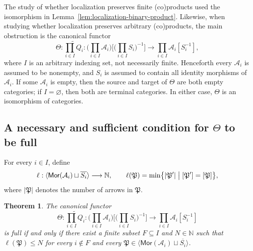 \documentclass[10pt,a4paper]{amsart}
\theoremstyle{plain}
\newtheorem{theorem}{Theorem}[section]
\theoremstyle{definition}
\theoremstyle{remark}
\begin{document}
The study of whether localization preserves finite (co)products used the isomorphism in Lemma~\ref{lem:localization-binary-product}.
Likewise, when studying whether localization preserves arbitrary (co)products, the main obstruction is the canonical functor
\[
  \Theta : \widetilde {\prod_{i \in I} Q_i} :
  \bigg(\prod_{i \in I} \mathcal{A}_i \bigg)\bigg[\big(\prod_{i \in I}S_i\big)^{-1}\bigg]
  \longrightarrow\prod_{i \in I}\mathcal{A}_i[S_i^{-1}],
\]
where $I$ is an arbitrary indexing set, not necessarily finite.
Henceforth every $\mathcal A_i$ is assumed to be nonempty, and $S_i$ is assumed to contain all identity morphisms of $\mathcal A_i$.
If some $\mathcal A_i$ is empty, then the source and target of $\Theta$ are both empty categories; if $I=\varnothing$, then both are terminal categories.
In either case, $\Theta$ is an isomorphism of categories.

\subsection{A necessary and sufficient condition for \texorpdfstring{$\Theta$}{Theta} to be full}
For every $i\in I$, define
\[
  \ell:
  \langle\mathsf{Mor}(\mathcal A_i)\sqcup\overline{S_i}\rangle
  \longrightarrow\mathbb N,
  \qquad
  \ell(\mathfrak P)
  =
  \min\bigl\{|\mathfrak P'|\bigm|[\mathfrak P']=[\mathfrak P]\bigr\},
\]
where $|\mathfrak P|$ denotes the number of arrows in $\mathfrak P$.

\begin{theorem}\label{thm:product-canonical-fullness}
  The canonical functor
  \[
    \Theta : \widetilde {\prod_{i \in I} Q_i} :
    \bigg(\prod_{i \in I} \mathcal{A}_i \bigg)\bigg[\big(\prod_{i \in I}S_i\big)^{-1}\bigg]
    \longrightarrow\prod_{i \in I}\mathcal{A}_i[S_i^{-1}]
  \]
  is full if and only if there exist a finite subset $F\subseteq I$ and $N\in\mathbb N$ such that $\ell(\mathfrak P)\leq N$ for every $i\notin F$ and every $\mathfrak P\in \langle\mathsf{Mor}(\mathcal A_i)\sqcup\overline{S_i}\rangle$.
\end{theorem}
\end{document}
